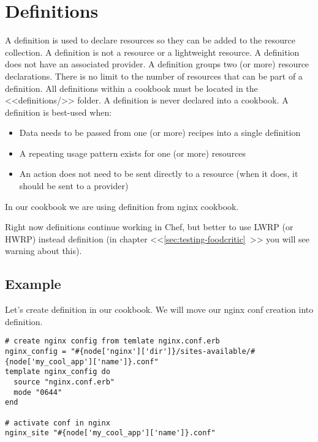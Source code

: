 \section{Definitions}
\label{sec:cookbook-definitions}

A definition is used to declare resources so they can be added to the resource collection. A definition is not a resource or a lightweight resource. A definition does not have an associated provider. A definition groups two (or more) resource declarations. There is no limit to the number of resources that can be part of a definition. All definitions within a cookbook must be located in the <<definitions/>> folder. A definition is never declared into a cookbook. A definition is best-used when:

\begin{itemize}
  \item Data needs to be passed from one (or more) recipes into a single definition
  \item A repeating usage pattern exists for one (or more) resources
  \item An action does not need to be sent directly to a resource (when it does, it should be sent to a provider)
\end{itemize}

In our  cookbook we are using  definition from nginx cookbook.

Right now definitions continue working in Chef, but better to use LWRP (or HWRP) instead definition (in chapter <<\ref{sec:testing-foodcritic}~>> you will see warning about this).

\subsection{Example}

Let's create definition in our  cookbook. We will move our nginx conf creation into definition.

\begin{lstlisting}[label=lst:cookbook-definitions-default1,title=my-server-cloud/site-cookbooks/my\_cool\_app/recipes/default.rb]
# create nginx config from temlate nginx.conf.erb
nginx_config = "#{node['nginx']['dir']}/sites-available/#{node['my_cool_app']['name']}.conf"
template nginx_config do
  source "nginx.conf.erb"
  mode "0644"
end

# activate conf in nginx
nginx_site "#{node['my_cool_app']['name']}.conf"
\end{lstlisting}

